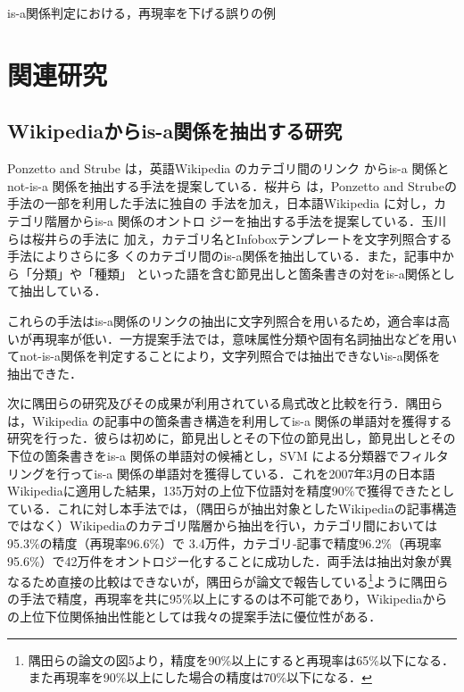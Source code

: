 \documentclass[japanese]{jnlp_1.4}
\begin{document}
\begin{table}[t]
\caption{is-a関係判定における，再現率を下げる誤りの例}
\label{tab:era-_isa_rei2}

\end{table}


\section{関連研究}
\label{sec:kanren_kenkyu}

\subsection{Wikipediaからis-a関係を抽出する研究}

Ponzetto and Strube \citeyear{Ponzetto}は，英語Wikipedia のカテゴリ間のリンク
からis-a 関係とnot-is-a 関係を抽出する手法を提案している．桜井ら
\citeyear{Sakurai}は，Ponzetto and Strubeの手法の一部を利用した手法に独自の
手法を加え，日本語Wikipedia に対し，カテゴリ階層からis-a 関係のオントロ
ジーを抽出する手法を提案している．玉川ら\citeyear{Tamagawa}は桜井らの手法に
加え，カテゴリ名とInfoboxテンプレートを文字列照合する手法によりさらに多
くのカテゴリ間のis-a関係を抽出している．また，記事中から「分類」や「種類」
といった語を含む節見出しと箇条書きの対をis-a関係として抽出している．

これらの手法はis-a関係のリンクの抽出に文字列照合を用いるため，適合率は高
いが再現率が低い．一方提案手法では，意味属性分類や固有名詞抽出などを用い
てnot-is-a関係を判定することにより，文字列照合では抽出できないis-a関係を
抽出できた．

次に隅田らの研究\cite{Sumida}及びその成果が利用されている鳥式改\cite{Torisawa}と比較を行う．隅田らは，Wikipedia の記事中の箇条書き構造を利用してis-a 関係の単語対を獲得する研究を行った．彼らは初めに，節見出しとその下位の節見出し，節見出しとその下位の箇条書きをis-a 関係の単語対の候補とし，SVM による分類器でフィルタリングを行ってis-a 関係の単語対を獲得している．これを2007年3月の日本語Wikipediaに適用した結果，135万対の上位下位語対を精度90\%で獲得できたとしている．これに対し本手法では，（隅田らが抽出対象としたWikipediaの記事構造ではなく）Wikipediaのカテゴリ階層から抽出を行い，カテゴリ間においては 95.3\%の精度（再現率96.6\%）で 3.4万件，カテゴリ‐記事で精度96.2\%（再現率95.6\%）で42万件をオントロジー化することに成功した．両手法は抽出対象が異なるため直接の比較はできないが，隅田らが論文で報告している\footnote{隅田らの論文の図5より，精度を90\%以上にすると再現率は65\%以下になる．また再現率を90\%以上にした場合の精度は70\%以下になる．}ように隅田らの手法で精度，再現率を共に95\%以上にするのは不可能であり，Wikipediaからの上位下位関係抽出性能としては我々の提案手法に優位性がある．
\end{document}
